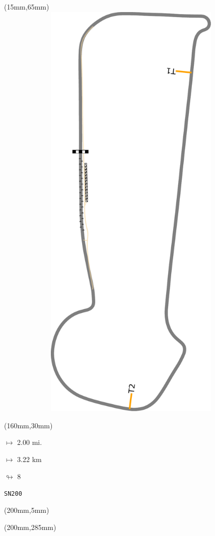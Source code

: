 \begin{textblock*}{185mm}(15mm,65mm)%
\centering
\mbox{\includegraphics[width=185mm,height=210mm,keepaspectratio]{PT/SN200.pdf}}
\end{textblock*}
\begin{textblock*}{40mm}(160mm,30mm)%
\Large
\par$\mapsto$ 2.00 mi.
\par$\mapsto$ 3.22 km
\par$\looparrowright$ 8
\par\hfill\tiny\tt SN200\\
\end{textblock*}
\begin{textblock*}{20mm}(200mm,5mm)%
\fbox{\thepage}
\label{SN200}
\end{textblock*}
\begin{textblock*}{20mm}(200mm,285mm)%
\fbox{\thepage}
\end{textblock*}

